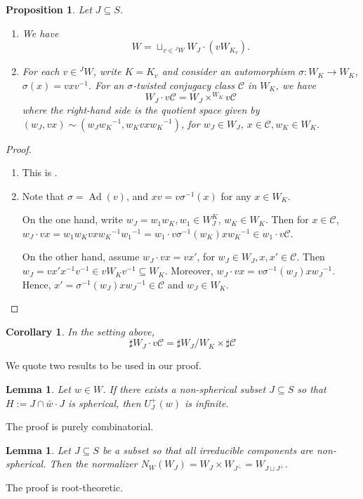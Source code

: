 \documentclass[a4paper, reqno, 14pt]{amsart}
\def\i{{^{-1}}}
\def\subset{\subseteq}
\DeclareMathOperator{\Ad}{Ad}
\newtheorem{prop}[thm]{Proposition}
\newtheorem{lem}[thm]{Lemma}
\newtheorem{cor}[thm]{Corollary}
\theoremstyle{definition}
\theoremstyle{remark}
\numberwithin{equation}{section}
\numberwithin{thm}{section}
\begin{document}
    \begin{prop} \label{thm:partialconjdecom}
    Let $J\subset S$.
    \begin{enumerate}
        \item We have $$W=\sqcup_{v \in  {}^JW} W_J \cdot (v W_{K_v}).$$ 
        
    
        \item For each $v\in {}^JW$, write $K=K_v$ and consider an automorphism
        $\sigma: W_K\to W_K$, $\sigma(x)=vxv\i$. For an $\sigma$-twisted conjugacy class $\mathcal{C}$ in $W_K$, we have $$W_J\cdot v\mathcal{C}=W_J \times^{W_K} v\mathcal{C}$$ 
    where the right-hand side is the quotient space given by $(w_J,vx)\sim (w_Jw_K\i,w_Kvxw_K\i)$, for $w_J\in W_J$, $x\in \mathcal{C},w_K\in W_K$. 
    \end{enumerate}
    \end{prop}

    \begin{proof}
        \begin{enumerate}
            \item This is \cite[Corollary 2.6]{he2007minimal}.
            \item Note that $\sigma=\Ad(v)$, and $xv=v\sigma\i(x)$ for any $x\in W_K$. 

            On the one hand, write $w_J=w_1w_K, w_1\in W_J^K$, $w_K\in W_K$. Then for $x\in \mathcal{C}$, $w_J\cdot vx=w_1w_Kvxw_K\i w_1\i=w_1\cdot v\sigma\i(w_K)xw_K\i\in w_1\cdot v\mathcal{C}$.

            On the other hand, assume $w_J\cdot vx=vx'$, for $w_J\in W_J,x,x'\in \mathcal{C}$. Then $w_J=vx'x\i v\i\in vW_Kv\i \subset W_K$. Moreover, $w_J\cdot vx=v\sigma\i(w_J)xw_J\i$. Hence, $x'=\sigma\i(w_J)xw_J\i\in \mathcal{C}$ and $w_J\in W_K$.
        \end{enumerate}
    \end{proof}

    \begin{cor} \label{cor:counting}
        In the setting above, $$\sharp W_J\cdot v\mathcal{C}=\sharp W_J /W_K\times \sharp\mathcal{C}$$ 
    \end{cor}

    We quote two results to be used in our proof.
    \begin{lem}\cite[Lemma 3.3]{marquis2024centre}\label{lem:MarquisComb}
        Let $w\in W$. If there exists a non-spherical subset $J\subset S$ so that $H:=J\cap \bar{w}\cdot J$ is spherical, then $U^+_J(w)$ is infinite.
    \end{lem}
    The proof is purely combinatorial.
    \begin{lem}\cite[Lemma 2.1]{capraceMarquis2013open}\label{lem:normalizer}
        Let $J\subset S$ be a subset so that all irreducible components are non-spherical. Then the normalizer $N_W(W_J)=W_J\times W_{J^\perp}=W_{J\sqcup J^\perp}$.
    \end{lem}
    The proof is root-theoretic.
    
\end{document}
